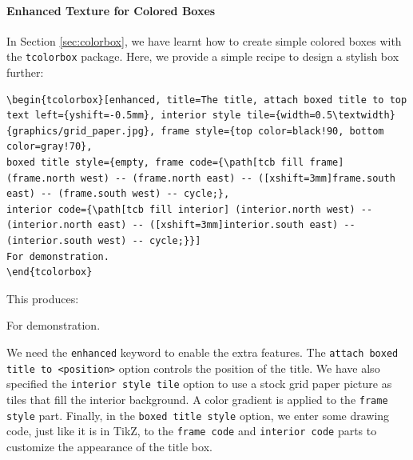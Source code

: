 \paragraph{Enhanced Texture for Colored Boxes}
In Section \ref{sec:colorbox}, we have learnt how to create simple colored boxes with the \texttt{tcolorbox} package. Here, we provide a simple recipe to design a stylish box further:
\begin{lstlisting}
\begin{tcolorbox}[enhanced, title=The title, attach boxed title to top text left={yshift=-0.5mm}, interior style tile={width=0.5\textwidth}{graphics/grid_paper.jpg}, frame style={top color=black!90, bottom color=gray!70},
boxed title style={empty, frame code={\path[tcb fill frame] (frame.north west) -- (frame.north east) -- ([xshift=3mm]frame.south east) -- (frame.south west) -- cycle;},
interior code={\path[tcb fill interior] (interior.north west) -- (interior.north east) -- ([xshift=3mm]interior.south east) -- (interior.south west) -- cycle;}}]
For demonstration.
\end{tcolorbox}    
\end{lstlisting}
This produces:
\begin{tcolorbox}[enhanced, title=The title, attach boxed title to top text left={yshift=-0.5mm}, interior style tile={width=0.5\textwidth}{graphics/grid_paper.jpg}, frame style={top color=black!90, bottom color=gray!70},
boxed title style={empty, frame code={\path[tcb fill frame] (frame.north west) -- (frame.north east) -- ([xshift=3mm]frame.south east) -- (frame.south west) -- cycle;},
interior code={\path[tcb fill interior] (interior.north west) -- (interior.north east) -- ([xshift=3mm]interior.south east) -- (interior.south west) -- cycle;}}]
For demonstration.
\end{tcolorbox}
We need the \texttt{enhanced} keyword to enable the extra features. The \texttt{attach boxed title to <position>} option controls the position of the title. We have also specified the \texttt{interior style tile} option to use a stock grid paper picture as tiles that fill the interior background. A color gradient is applied to the \texttt{frame style} part. Finally, in the \texttt{boxed title style} option, we enter some drawing code, just like it is in TikZ, to the \texttt{frame code} and \texttt{interior code} parts to customize the appearance of the title box.
